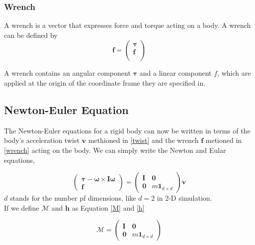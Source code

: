     \subsubsection{Wrench}
        A wrench is a vector that expresses force and torque acting on a body. A wrench can be defined by
        \begin{equation}
            \mathbf{f} = \left( \begin{array}{c} \pmb{\tau} \\ \pmb{f} \\ \end{array} \right ) 
        \end{equation}

        A wrench contains an angular component $\pmb{\tau}$ and a linear component $f$, which are applied at the origin of the coordinate frame they are specified in.


\subsection{Newton-Euler Equation}
    The Newton-Euler equations for a rigid body can now be written in terms of the body's acceleration twist $\mathbf{v}$ methioned in \ref{twist} and the wrench $\mathbf{f}$ metioned in \ref{wrench} acting on the body. We can simply write the Newton and Eular equations,

    \begin{equation}
        \left( \begin{array}{c} \pmb{\tau} - \pmb{\omega} \times \pmb{I} \pmb{\omega}\\ \pmb{f} \end{array}\right) = \left( \begin{array}{cc} \pmb{I} & \pmb{0} \\ \pmb{0}& m\pmb{1}_{d\times d}\end{array} \right ) \dot{\mathbf{v}}
    \end{equation}
    $d$ stands for the number pf dimensions, like $d=2$ in $2$-D simulation. \\

    If we define $\mathcal{M}$ and $\mathbf{h}$ as Equation \ref{M} and \ref{h}

    \begin{equation}
        \mathcal{M} = \left( \begin{array}{cc} \pmb{I} & \pmb{0} \\ \pmb{0} & m\pmb{1}_{d \times d}\end{array} \right)
        \label{M}
    \end{equation}

